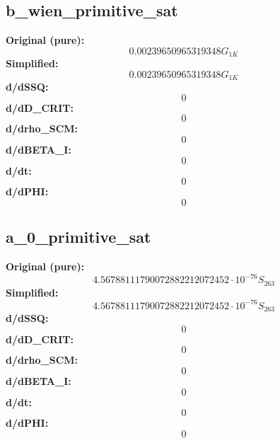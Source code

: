 \subsection{b_wien_primitive_sat}
\textbf{Original (pure):}
\begin{equation}
0.00239650965319348 G_{1 K}
\end{equation}
\textbf{Simplified:}
\begin{equation}
0.00239650965319348 G_{1 K}
\end{equation}
\textbf{d/dSSQ:}
\begin{equation}
0
\end{equation}
\textbf{d/dD_CRIT:}
\begin{equation}
0
\end{equation}
\textbf{d/drho_SCM:}
\begin{equation}
0
\end{equation}
\textbf{d/dBETA_I:}
\begin{equation}
0
\end{equation}
\textbf{d/dt:}
\begin{equation}
0
\end{equation}
\textbf{d/dPHI:}
\begin{equation}
0
\end{equation}

\subsection{a_0_primitive_sat}
\textbf{Original (pure):}
\begin{equation}
4.56788111790072882212072452 \cdot 10^{-76} S_{26 3}
\end{equation}
\textbf{Simplified:}
\begin{equation}
4.56788111790072882212072452 \cdot 10^{-76} S_{26 3}
\end{equation}
\textbf{d/dSSQ:}
\begin{equation}
0
\end{equation}
\textbf{d/dD_CRIT:}
\begin{equation}
0
\end{equation}
\textbf{d/drho_SCM:}
\begin{equation}
0
\end{equation}
\textbf{d/dBETA_I:}
\begin{equation}
0
\end{equation}
\textbf{d/dt:}
\begin{equation}
0
\end{equation}
\textbf{d/dPHI:}
\begin{equation}
0
\end{equation}

